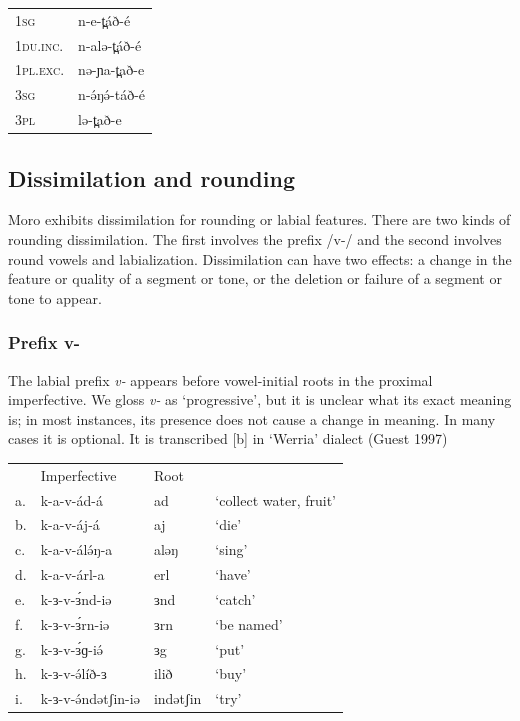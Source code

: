 \ea
\begin{tabular}[t]{ll}
1\textsc{sg}		&	n-e-t̪áð-é	\\	 
1\textsc{du.inc.}&	n-alə-t̪áð-é\\
1\textsc{pl.exc.}&	nə-ɲa-t̪að-e \\
3\textsc{sg}		&	n-ə́ŋə́-táð-é \\
3\textsc{pl}		&	lə-t̪að-e\\
\end{tabular}
\z

\subsection{Dissimilation and rounding}\label{sec:ch5:dissimilation}
Moro exhibits dissimilation for rounding or labial features. There are two kinds of rounding dissimilation. The first involves the prefix /v-/ and the second involves round vowels and labialization. Dissimilation can have two effects: a change in the feature or quality of a segment or tone, or the deletion or failure of a segment or tone to appear. 

\subsubsection{Prefix v-}
The labial prefix \textit{v-} appears before vowel-initial roots in the proximal imperfective. We gloss \textit{v-} as ‘progressive’, but it is unclear what its exact meaning is; in most instances, its presence does not cause a change in meaning. In many cases it is optional. It is transcribed [b] in ‘Werria’ dialect (Guest 1997)

\ea
\begin{tabular}[t]{llll}
&	 	Imperfective	&	Root\\
	a.&	k-a-v-ád-á		&	ad		&	‘collect water, fruit’	\\
	b.&	k-a-v-áj-á		&	aj		&	‘die’\\
	c.&	k-a-v-álə́ŋ-a		&	aləŋ	&	‘sing’\\
	d.&	k-a-v-árl-a		&	erl		&	‘have’\\
	e.&	k-ɜ-v-ɜ́nd-iə	&	ɜnd		&	‘catch’\\
	f.&	k-ɜ-v-ɜ́rn-iə	&	ɜrn		&	‘be named’\\
	g.&	k-ɜ-v-ɜ́ɡ-iə́		&	ɜg		&	‘put’\\
	h.&	k-ɜ-v-ə́líð-ɜ		&	ilið		&	‘buy’\\
	i.&	k-ɜ-v-ə́ndətʃin-iə&	indətʃin&	‘try’\\
\end{tabular}
\z

